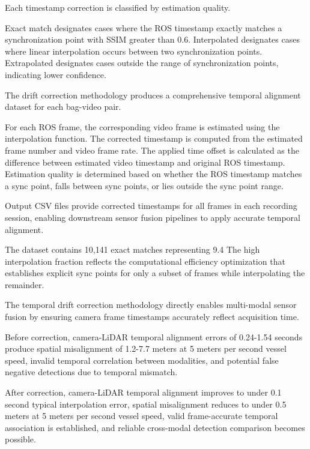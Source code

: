 \documentclass{erauthesis}
\begin{document}

Each timestamp correction is classified by estimation quality.

Exact match designates cases where the ROS timestamp exactly matches a synchronization point with SSIM greater than 0.6.
Interpolated designates cases where linear interpolation occurs between two synchronization points.
Extrapolated designates cases outside the range of synchronization points, indicating lower confidence.


The drift correction methodology produces a comprehensive temporal alignment dataset for each bag-video pair.

For each ROS frame, the corresponding video frame is estimated using the interpolation function.
The corrected timestamp is computed from the estimated frame number and video frame rate.
The applied time offset is calculated as the difference between estimated video timestamp and original ROS timestamp.
Estimation quality is determined based on whether the ROS timestamp matches a sync point, falls between sync points, or lies outside the sync point range.

Output CSV files provide corrected timestamps for all frames in each recording session, enabling downstream sensor fusion pipelines to apply accurate temporal alignment.

The dataset contains 10,141 exact matches representing 9.4%
The high interpolation fraction reflects the computational efficiency optimization that establishes explicit sync points for only a subset of frames while interpolating the remainder.


The temporal drift correction methodology directly enables multi-modal sensor fusion by ensuring camera frame timestamps accurately reflect acquisition time.

Before correction, camera-LiDAR temporal alignment errors of 0.24-1.54 seconds produce spatial misalignment of 1.2-7.7 meters at 5 meters per second vessel speed, invalid temporal correlation between modalities, and potential false negative detections due to temporal mismatch.

After correction, camera-LiDAR temporal alignment improves to under 0.1 second typical interpolation error, spatial misalignment reduces to under 0.5 meters at 5 meters per second vessel speed, valid frame-accurate temporal association is established, and reliable cross-modal detection comparison becomes possible.
\end{document}

